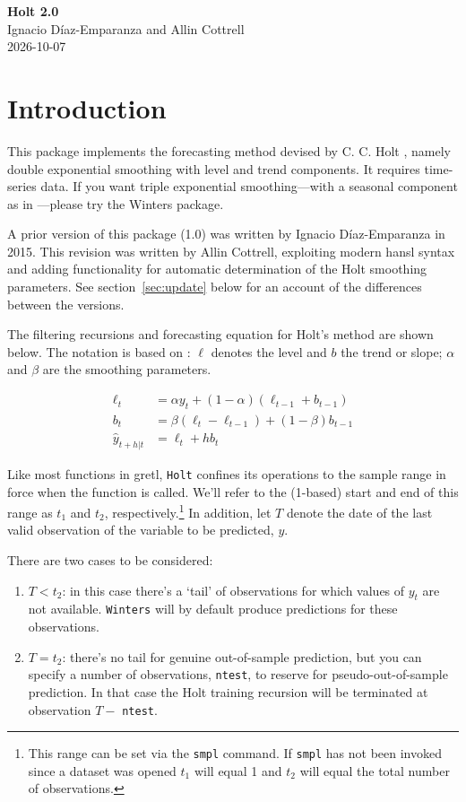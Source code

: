 \documentclass{article}
\begin{document}
\begin{center}
  {\Large \textbf{Holt 2.0}} \\[6pt]
  Ignacio Díaz-Emparanza and Allin Cottrell \\[6pt]
  2026-10-07
\end{center}

\section{Introduction}
\label{sec:intro}

This package implements the forecasting method devised by C. C. Holt
\citeyearpar{holt57}, namely double exponential smoothing with level and
trend components.  It requires time-series data. If you want triple
exponential smoothing---with a seasonal component as in
\citet{winters60}---please try the \textsf{Winters} package.

A prior version of this package (1.0) was written by Ignacio
Díaz-Emparanza in 2015. This revision was written by Allin Cottrell,
exploiting modern hansl syntax and adding functionality for automatic
determination of the Holt smoothing parameters. See
section~\ref{sec:update} below for an account of the differences between
the versions.

The filtering recursions and forecasting equation for Holt's method are
shown below. The notation is based on \citet[section 8.2]{hyndman2021}:
$\ell$ denotes the level and $b$ the trend or slope; $\alpha$ and
$\beta$ are the smoothing parameters.

\begin{align*}
  \ell_t &= \alpha y_t + (1-\alpha) (\ell_{t-1} + b_{t-1})\\
  b_t &= \beta (\ell_t - \ell_{t-1}) + (1-\beta) b_{t-1}\\
  \hat{y}_{t+h|t} &= \ell_t + hb_t
\end{align*}

Like most functions in gretl, \texttt{Holt} confines its operations
to the sample range in force when the function is called. We'll refer
to the (1-based) start and end of this range as $t_1$ and $t_2$,
respectively.\footnote{This range can be set via the \texttt{smpl}
  command. If \texttt{smpl} has not been invoked since a dataset was
  opened $t_1$ will equal 1 and $t_2$ will equal the total number of
  observations.}  In addition, let $T$ denote the date of the last
valid observation of the variable to be predicted, $y$.

There are two cases to be considered:
\begin{enumerate}
\item $T < t_2$: in this case there's a `tail' of observations for
  which values of $y_t$ are not available.  \texttt{Winters} will by
  default produce predictions for these observations.
\item $T = t_2$: there's no tail for genuine out-of-sample prediction,
  but you can specify a number of observations, \texttt{ntest}, to
  reserve for pseudo-out-of-sample prediction. In that case the
  Holt training recursion will be terminated at observation $T-$
  \texttt{ntest}.
\end{enumerate}
\end{document}
